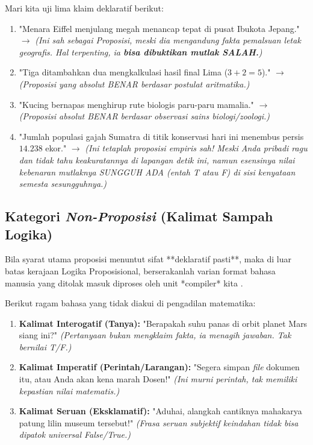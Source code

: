 \begin{contoh}
Mari kita uji lima klaim deklaratif berikut:
\begin{enumerate}
    \item "Menara Eiffel menjulang megah menancap tepat di pusat Ibukota Jepang." $\rightarrow$ \textit{(Ini sah sebagai Proposisi, meski dia mengandung fakta pemalsuan letak geografis. Hal terpenting, ia \textbf{bisa dibuktikan mutlak SALAH.})}
    \item "Tiga ditambahkan dua mengkalkulasi hasil final Lima ($3 + 2 = 5$)." $\rightarrow$ \textit{(Proposisi yang absolut BENAR berdasar postulat aritmatika.)}
    \item "Kucing bernapas menghirup rute biologis paru-paru mamalia." $\rightarrow$ \textit{(Proposisi absolut BENAR berdasar observasi sains biologi/zoologi.)}
    \item "Jumlah populasi gajah Sumatra di titik konservasi hari ini menembus persis $14.238$ ekor." $\rightarrow$ \textit{(Ini tetaplah proposisi empiris sah! Meski Anda pribadi ragu dan tidak tahu keakuratannya di lapangan detik ini, namun esensinya nilai kebenaran mutlaknya SUNGGUH ADA (entah T atau F) di sisi kenyataan semesta sesungguhnya.)}
\end{enumerate}
\end{contoh}

\subsection{Kategori \textit{Non-Proposisi} (Kalimat Sampah Logika)}

Bila syarat utama proposisi menuntut sifat **deklaratif pasti**, maka di luar batas kerajaan Logika Proposisional, berserakanlah varian format bahasa manusia yang ditolak masuk diproses oleh unit *compiler* kita \cite{wiki_first_order_logic}.

\begin{contoh}
Berikut ragam bahasa yang tidak diakui di pengadilan matematika:
\begin{enumerate}
    \item \textbf{Kalimat Interogatif (Tanya):} "Berapakah suhu panas di orbit planet Mars siang ini?" \textit{(Pertanyaan bukan mengklaim fakta, ia menagih jawaban. Tak bernilai T/F.)}
    \item \textbf{Kalimat Imperatif (Perintah/Larangan):} "Segera simpan \textit{file} dokumen itu, atau Anda akan kena marah Dosen!" \textit{(Ini murni perintah, tak memiliki kepastian nilai matematis.)}
    \item \textbf{Kalimat Seruan (Eksklamatif):} "Aduhai, alangkah cantiknya mahakarya patung lilin museum tersebut!" \textit{(Frasa seruan subjektif keindahan tidak bisa dipatok universal False/True.)}
\end{enumerate}
\end{contoh}

